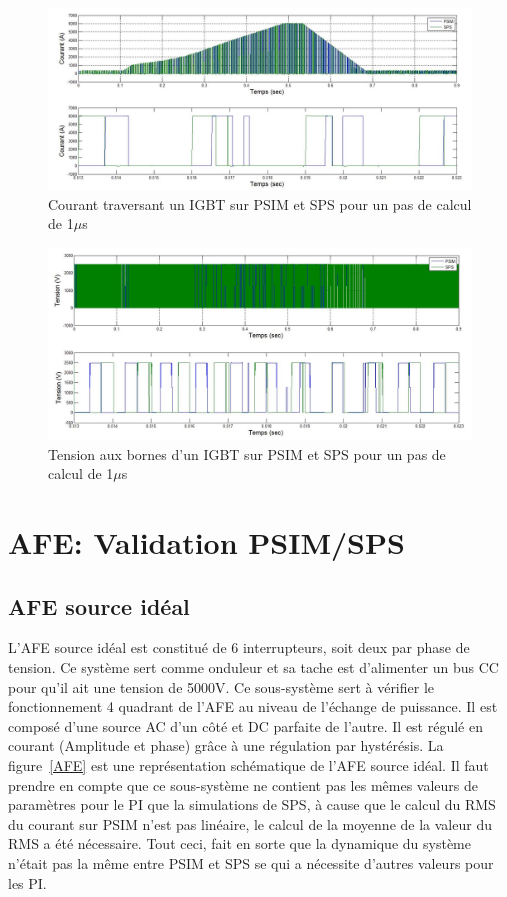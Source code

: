 \documentclass[11pt,letterpaper,final]{report}
\begin{document}
\begin{figure}[htb]
\centering
\includegraphics[scale=0.5]{Fig/DCPDCN/DCPCourantIGBT1u.jpg}
\caption{Courant traversant un IGBT sur PSIM et SPS pour un pas de calcul de 1$\mu$s}
\label{DC_IG_cou_1}
\end{figure}


\begin{figure}[htb]
\centering
\includegraphics[scale=0.5]{Fig/DCPDCN/DCPTensionIGBT1u.jpg}
\caption{Tension aux bornes d'un IGBT sur PSIM et SPS pour un pas de calcul de 1$\mu$s}
\label{DC_IG_ten_1}
\end{figure}


\clearpage
\section{AFE: Validation PSIM/SPS}
\subsection{AFE source idéal}
L'AFE source idéal est constitué de 6 interrupteurs, soit deux par phase de tension. Ce système sert comme onduleur et sa tache est d'alimenter un bus CC pour qu'il ait une tension de 5000V. Ce sous-système sert à vérifier le fonctionnement 4 quadrant de l'AFE au niveau de l'échange de puissance. Il est composé d'une source AC d'un côté et DC parfaite de l'autre. Il est régulé en courant (Amplitude et phase) grâce à une régulation par hystérésis. La figure~\ref{AFE} est une représentation schématique de l'AFE source idéal. Il faut prendre en compte que ce sous-système ne contient pas les mêmes valeurs de paramètres pour le PI que la simulations de SPS, à cause que le calcul du RMS du courant sur PSIM n'est pas linéaire, le calcul de la moyenne de la valeur du RMS a été nécessaire. Tout ceci, fait en sorte que la dynamique du système n'était pas la même entre PSIM et SPS se qui a nécessite d'autres valeurs pour les PI.
\end{document}
